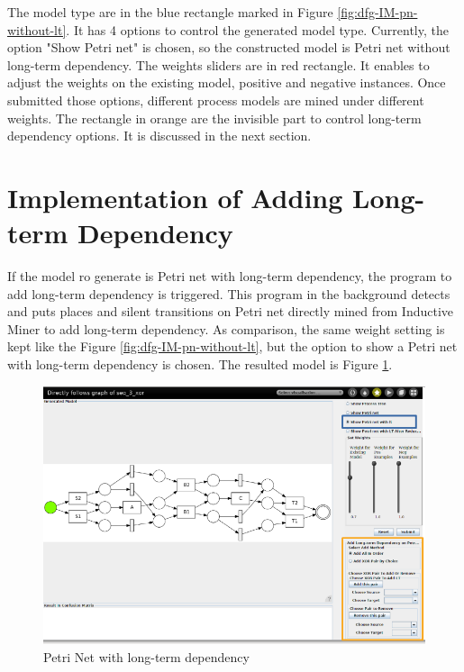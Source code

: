 The model type are in the blue rectangle marked in Figure \ref{fig:dfg-IM-pn-without-lt}. It has 4 options to control the generated model type. Currently, the option "Show Petri net" is chosen, so the constructed model is Petri net without long-term dependency. The weights sliders are in red rectangle. It enables to adjust the weights on the existing model, positive and negative instances. Once submitted those options, different process models are mined under different weights. The rectangle in orange are the invisible part to control long-term dependency options. It is discussed in the next section.

\section{Implementation of Adding Long-term Dependency }
If the model ro generate is Petri net with long-term dependency, the program to add long-term dependency is triggered. This program in the background detects and puts places and silent transitions on Petri net directly mined from Inductive Miner to add long-term dependency. As comparison, the same weight setting is kept like the Figure \ref{fig:dfg-IM-pn-without-lt}, but the option to show a Petri net with long-term dependency is chosen. The resulted model is Figure \ref{fig:dfg-IM-pn-with-lt}. 
\begin{figure}
	\centering
	\includegraphics[width=\textwidth]{figures/implementation/dfg-IM-pn-with-lt.png}
	\caption{Petri Net with long-term dependency }
	\label{fig:dfg-IM-pn-with-lt}
\end{figure}

